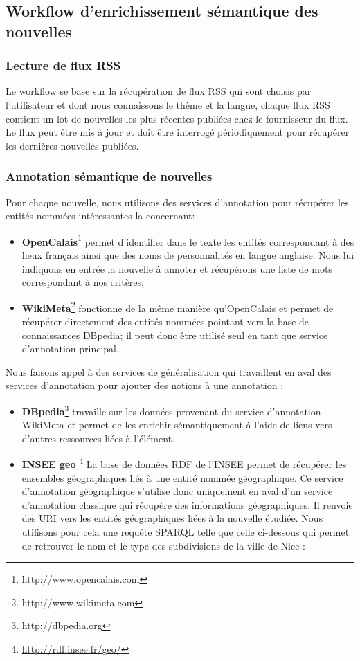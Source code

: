 \documentclass[]{easychair}
\begin{document}
\subsection{Workflow d'enrichissement sémantique des nouvelles}

\subsubsection{Lecture de flux RSS}
Le workflow se base sur la récupération de flux RSS qui sont choisis par l'utilisateur et dont nous connaissons le thème et la langue, chaque flux RSS contient un lot de nouvelles les plus récentes publiées chez le fournisseur du flux. Le flux peut être mis à jour et doit être interrogé périodiquement pour récupérer les dernières nouvelles publiées.

\subsubsection{Annotation sémantique de nouvelles}
Pour chaque nouvelle, nous utilisons des services d'annotation pour récupérer les entités nommées intéressantes la concernant: 
\begin{itemize}
	\item \textbf{OpenCalais}\footnote{http://www.opencalais.com} permet d'identifier dans le texte les entités correspondant à des lieux français ainsi que des noms de personnalités en langue anglaise. Nous lui indiquons en entrée la nouvelle à annoter et récupérons une liste de mots correspondant à nos critères;
  \item \textbf{WikiMeta}\footnote{http://www.wikimeta.com} fonctionne de la même manière qu'OpenCalais et permet de récupérer directement des entités nommées pointant vers la base de connaissances DBpedia; il peut donc être utilisé seul en tant que service d'annotation principal.
\end{itemize}

Nous faisons appel à des services de généralisation qui travaillent en aval des services d'annotation pour ajouter des notions à une annotation :
\begin{itemize}
	\item \textbf{DBpedia}\footnote{http://dbpedia.org} travaille sur les données provenant du service d'annotation WikiMeta et permet de les enrichir sémantiquement à l'aide de liens vers d'autres ressources liées à l'élément.
  \item \textbf{INSEE geo} \footnote{\url{http://rdf.insee.fr/geo/}} La base de données RDF de l'INSEE permet de récupérer les ensembles géographiques liés à une entité nommée géographique. Ce service d'annotation géographique s'utilise donc uniquement en aval d'un service d'annotation classique qui récupère des informations géographiques. Il renvoie des URI vers les entités géographiques liées à la nouvelle étudiée. Nous utilisons pour cela une requête SPARQL telle que celle ci-dessous qui permet de retrouver le nom et le type des subdivisions de la ville de Nice :
\end{itemize}
\end{document}
